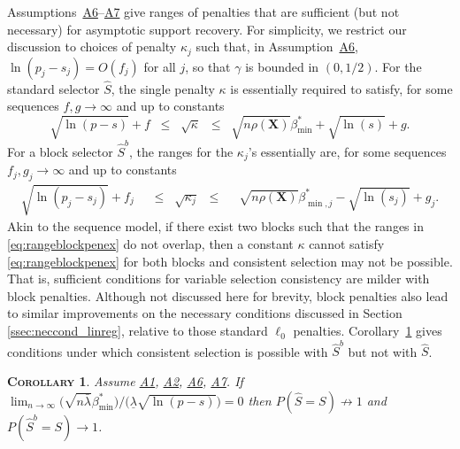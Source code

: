 \documentclass[bj,authoryear]{imsart}
\theoremstyle{plain}
\newtheorem{cor}[thm]{\textsc{Corollary}}
\newcommand{\bs}{\boldsymbol}
\begin{document}
\smallskip

\noindent Assumptions~\hyperlink{lab:A6}{A6}--\hyperlink{lab:A7}{A7} give ranges of penalties that are sufficient (but not necessary) for asymptotic support recovery. For simplicity, we restrict our discussion to choices of penalty $\kappa_j$ such that, in Assumption~\hyperlink{lab:A6}{A6}, $\ln(p_j-s_j)=O(f_j)$ for all $j$, so that $\gamma$ is bounded in $(0,1/2)$. For the standard selector $\hat{S}$, the single penalty $\kappa$ is essentially required to satisfy,
for some sequences $f,g\to\infty$ and up to constants
\begin{equation}\label{eq:rangepenex}
  \sqrt{\ln(p-s)}+ f\;\;\leq\;\;\sqrt{\kappa}\;\;\leq\;\;\sqrt{n\rho(\bs X)}\beta^*_{\min}+\sqrt{\ln(s)} + g.	
\end{equation}
For a block selector $\hat{S}^{b}$, the ranges for the $\kappa_j$'s essentially are, for some sequences $f_j,g_j\to\infty$ and up to constants
    \begin{eqnarray}\label{eq:rangeblockpenex}
      \sqrt{\ln(p_j-s_j)}+f_j\;\;&\leq\;\;\sqrt{\kappa_j}\;\;\leq&\;\;\sqrt{n\rho(\bs X)}\beta^*_{\min,j}-\sqrt{\ln(s_j)} + g_j.
    \end{eqnarray}
Akin to the sequence model, if there exist two blocks such that the ranges in \eqref{eq:rangeblockpenex} do not overlap, then a constant $\kappa$ cannot satisfy \eqref{eq:rangeblockpenex} for both blocks and consistent selection may not be possible.
That is, sufficient conditions for variable selection consistency are milder with block penalties. Although not discussed here for brevity, block penalties also lead to similar improvements on the necessary conditions discussed in Section \ref{ssec:neccond_linreg}, relative to those standard $\ell_0$ penalties.
Corollary~\ref{cor:selconstimpossiblereg} gives conditions under which consistent selection is possible with $\hat S^b$ but not with $\hat S$.
\begin{cor}\label{cor:selconstimpossiblereg}
Assume \hyperlink{lab:A1}{A1}, \hyperlink{lab:A2}{A2}, \hyperlink{lab:A6}{A6}, \hyperlink{lab:A7}{A7}. If
$\lim_{n\to\infty}\big(\sqrt{n\bar{\lambda}}\beta_{\min}^*\big)/\big(\underline{\lambda}\sqrt{\ln(p-s)}\big) = 0$
then 
$P(\hat{S} = S)\not \to 1$ and $P(\hat{S}^{b} = S)\to 1$.
\end{cor}
\end{document}
